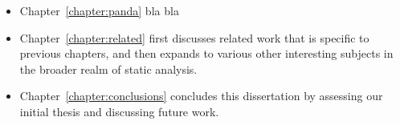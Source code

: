 \begin{itemize}[$\bullet$]
\item Chapter~\ref{chapter:panda} bla bla

\item Chapter~\ref{chapter:related} first discusses related work that is specific to previous chapters, and then expands to various other interesting subjects in the broader realm of static analysis.


\item Chapter~\ref{chapter:conclusions} concludes this dissertation by assessing our initial thesis and discussing future work.
\end{itemize}